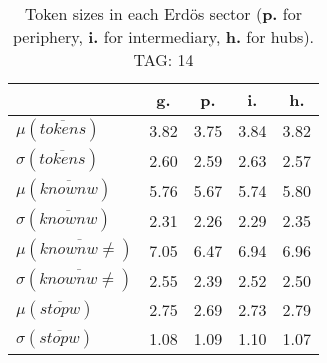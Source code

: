 \begin{table}[h!]
\begin{center}
\begin{tabular}{| l | c | c | c | c |}\hline
 & g. & p. & i. & h. \\\hline
$\mu(\overline{tokens})$ & 3.82  & 3.75  & 3.84  & 3.82 \\\hline
$\sigma(\overline{tokens})$ & 2.60  & 2.59  & 2.63  & 2.57 \\\hline
$\mu(\overline{knownw})$ & 5.76  & 5.67  & 5.74  & 5.80 \\\hline
$\sigma(\overline{knownw})$ & 2.31  & 2.26  & 2.29  & 2.35 \\\hline
$\mu(\overline{knownw \neq})$ & 7.05  & 6.47  & 6.94  & 6.96 \\\hline
$\sigma(\overline{knownw \neq})$ & 2.55  & 2.39  & 2.52  & 2.50 \\\hline
$\mu(\overline{stopw})$ & 2.75  & 2.69  & 2.73  & 2.79 \\\hline
$\sigma(\overline{stopw})$ & 1.08  & 1.09  & 1.10  & 1.07 \\\hline
\end{tabular}
\caption{Token sizes in each Erd\"os sector ({{\bf p.}} for periphery, {{\bf i.}} for intermediary, {{\bf h.}} for hubs). TAG: 14}
\end{center}
\end{table}